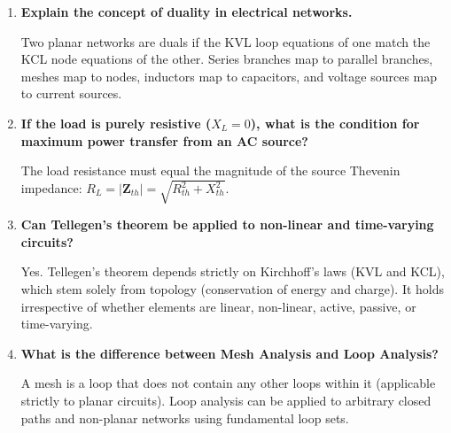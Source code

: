 \documentclass[12pt,a4paper]{article}
\newcommand{\Q}[1]{\textbf{#1}\par\noindent\ignorespaces}
\begin{document}
\begin{tcolorbox}[exambox, title={\textbf{Frequently Asked / Viva Questions}}]
\begin{enumerate}[topsep=0pt, label=\textbf{Q\arabic*.}, itemsep=5pt]
  \item \Q{Explain the concept of duality in electrical networks.}
  Two planar networks are duals if the KVL loop equations of one match the KCL node equations of the other. Series branches map to parallel branches, meshes map to nodes, inductors map to capacitors, and voltage sources map to current sources.

  \item \Q{If the load is purely resistive ($X_L = 0$), what is the condition for maximum power transfer from an AC source?}
  The load resistance must equal the magnitude of the source Thevenin impedance: $R_L = |\mathbf{Z}_{th}| = \sqrt{R_{th}^2 + X_{th}^2}$.

  \item \Q{Can Tellegen's theorem be applied to non-linear and time-varying circuits?}
  Yes. Tellegen's theorem depends strictly on Kirchhoff's laws (KVL and KCL), which stem solely from topology (conservation of energy and charge). It holds irrespective of whether elements are linear, non-linear, active, passive, or time-varying.

  \item \Q{What is the difference between Mesh Analysis and Loop Analysis?}
  A mesh is a loop that does not contain any other loops within it (applicable strictly to planar circuits). Loop analysis can be applied to arbitrary closed paths and non-planar networks using fundamental loop sets.
\end{enumerate}
\end{tcolorbox}
\end{document}
